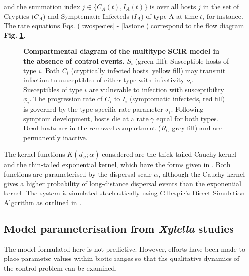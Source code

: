\documentclass[11pt,letterpaper]{article}
\begin{document}
and the summation index $j \in \{C_{A}(t), I_{A}(t) \}$ is over all hosts $j$ in the set of Cryptics ($C_A$) and Symptomatic Infecteds ($I_{A}$) of type A at time $t$, for instance.
The rate equations Eqs. (\ref{twospecies} - \ref{lastone}) correspond to the flow diagram \textbf{Fig. \ref{compartmentdiag}}.

\begin{figure}
	\centering
	
	\vspace*{5mm}
	\caption{ \label{compartmentdiag} \textbf{Compartmental diagram of the multitype SCIR model in the absence of control events.} $S_i$ (green fill): Susceptible hosts of type $i$. Both $C_i$ (cryptically infected hosts, yellow fill) may transmit infection to susceptibles of either type with infectivity $\nu_{i}$. Susceptibles of type $i$ are vulnerable to infection with susceptibility $\phi_{i}$. The progression rate of $C_{i}$ to $I_{i}$ (symptomatic infecteds, red fill) is governed by the type-specific rate parameter $\sigma_{i}$. Following symptom development, hosts die at a rate $\gamma$ equal for both types. Dead hosts are in the removed compartment ($R_{i}$, grey fill) and are permanently inactive.}
	\end{figure}

The kernel functions $K(d_{ij}; \alpha)$ considered are the thick-tailed Cauchy kernel and the thin-tailed exponential kernel, which have the forms given in \cite{HyattTwynam2017}. Both functions are parameterised by the dispersal scale $\alpha$, although the Cauchy kernel gives a higher probability of long-distance dispersal events than the exponential kernel.
The system is simulated stochastically using Gillespie's Direct Simulation Algorithm \cite{Gillespie1977} as outlined in \cite{Keeling2008}.

\FloatBarrier
\subsection*{Model parameterisation from \emph{Xylella} studies}

The model formulated here is not predictive. However, efforts have been made to place parameter values within biotic ranges so that the qualitative dynamics of the control problem can be examined. 
\end{document}
